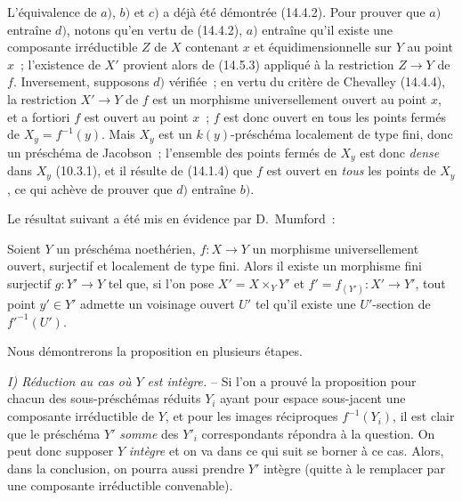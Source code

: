 L'équivalence de $a)$, $b)$ et $c)$ a déjà été démontrée (14.4.2). Pour prouver
que $a)$ entraîne $d)$, notons qu'en vertu de (14.4.2), $a)$ entraîne qu'il existe
une composante irréductible $Z$ de $X$ contenant $x$ et équidimensionnelle sur $Y$
au point $x$~; l'existence de $X'$ provient alors de (14.5.3) appliqué à la
restriction $Z\to Y$ de $f$. Inversement, supposons $d)$ vérifiée~; en vertu du
critère de Chevalley (14.4.4), la restriction $X'\to Y$ de $f$ est un morphisme
universellement ouvert au point $x$, et a fortiori $f$ est ouvert au point $x$~;
$f$ est donc ouvert en tous les points fermés de $X_y=f^{-1}(y)$. Mais $X_y$ est
un $k(y)$-préschéma localement de type fini, donc un préschéma de Jacobson~;
l'ensemble des points fermés de $X_y$ est donc \emph{dense} dans $X_y$ (10.3.1),
et il résulte de (14.1.4) que $f$ est ouvert en \emph{tous} les points de $X_y$, ce
qui achève de prouver que $d)$ entraîne $b)$.

Le résultat suivant a été mis en évidence par D.~Mumford~:

\begin{proposition}[14.5.10]
\label{IV.14.5.10-fr}
Soient $Y$ un préschéma noethérien, $f:X\to Y$ un morphisme universellement ouvert,
surjectif et localement de type fini. Alors il existe un morphisme fini surjectif
$g:Y'\to Y$ tel que, si l'on pose $X'=X\times_Y Y'$ et
$f'=f_{(Y')}:X'\to Y'$, tout point $y'\in Y'$ admette un voisinage ouvert $U'$ tel
qu'il existe une $U'$-section de $f'^{-1}(U')$.
\end{proposition}

Nous démontrerons la proposition en plusieurs étapes.


\emph{I) Réduction au cas où $Y$ est intègre.} -- Si l'on a prouvé la proposition
pour chacun des sous-préschémas réduits $Y_i$ ayant pour espace sous-jacent une
composante irréductible de $Y$, et pour les images réciproques $f^{-1}(Y_i)$, il est
clair que le préschéma $Y'$ \emph{somme} des $Y'_i$ correspondants répondra à la
question. On peut donc supposer $Y$ \emph{intègre} et on va dans ce qui suit se
borner à ce cas. Alors, dans la conclusion, on pourra aussi prendre $Y'$ intègre
(quitte à le remplacer par une composante irréductible convenable).

